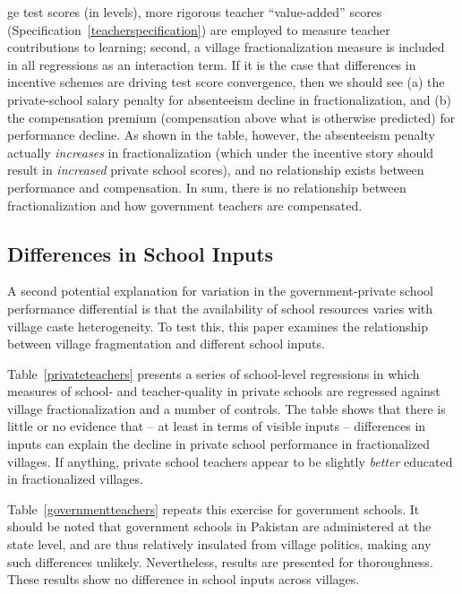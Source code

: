 \documentclass[Eubank_pk_ethnic_sorting.tex]{subfiles}
\begin{document}
ge test scores (in levels), more rigorous teacher ``value-added'' scores (Specification~\ref{teacherspecification}) are employed to measure teacher contributions to learning; second, a village fractionalization measure is included in all regressions as an interaction term. If it is the case that differences in incentive schemes are driving test score convergence, then we should see (a) the private-school salary penalty for absenteeism decline in fractionalization, and (b) the compensation premium (compensation above what is otherwise predicted) for performance decline. As shown in the table, however, the absenteeism penalty actually \emph{increases} in fractionalization (which under the incentive story should result in \emph{increased} private school scores), and no relationship exists between performance and compensation. In sum, there is no relationship between fractionalization and how government teachers are compensated.





\subsection{Differences in School Inputs}

A second potential explanation for variation in the government-private school performance differential is that the availability of school resources varies with village caste heterogeneity. To test this, this paper examines the relationship between village fragmentation and different school inputs. 

Table~\ref{privateteachers} presents a series of school-level regressions in which measures of school- and teacher-quality in private schools are regressed against village fractionalization and a number of controls. The table shows that there is little or no evidence that -- at least in terms of visible inputs -- differences in inputs can explain the decline in private school performance in fractionalized villages. If anything, private school teachers appear to be slightly \emph{better} educated in fractionalized villages.


Table~\ref{governmentteachers} repeats this exercise for government schools. It should be noted that government schools in Pakistan are administered at the state level, and are thus relatively insulated from village politics, making any such differences unlikely. Nevertheless, results are presented for thoroughness. These results show no difference in school inputs across villages. 


\end{document}
